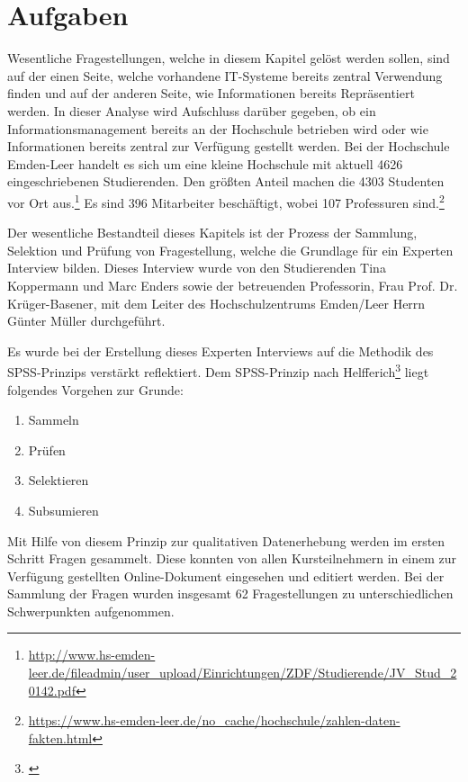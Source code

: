 \section{Aufgaben}
Wesentliche Fragestellungen, welche in diesem Kapitel gelöst werden sollen, sind auf der einen Seite, welche vorhandene IT-Systeme bereits zentral Verwendung finden und auf der anderen Seite, wie Informationen bereits Repräsentiert werden. In dieser Analyse wird Aufschluss darüber gegeben, ob ein Informationsmanagement bereits an der Hochschule betrieben wird oder wie Informationen bereits zentral zur Verfügung gestellt werden. 
Bei der Hochschule Emden-Leer handelt es sich um eine kleine Hochschule mit aktuell 4626 eingeschriebenen Studierenden. Den größten Anteil machen die 4303 Studenten vor Ort aus.\footnote{\url{http://www.hs-emden-leer.de/fileadmin/user_upload/Einrichtungen/ZDF/Studierende/JV_Stud_20142.pdf}} Es sind 396 Mitarbeiter beschäftigt, wobei 107 Professuren sind.\footnote{\url{https://www.hs-emden-leer.de/no_cache/hochschule/zahlen-daten-fakten.html}}

Der wesentliche Bestandteil dieses Kapitels ist der Prozess der Sammlung, Selektion und Prüfung von Fragestellung, welche die Grundlage für ein Experten Interview bilden. Dieses Interview wurde von den Studierenden Tina Koppermann und Marc Enders sowie der betreuenden Professorin, Frau Prof. Dr. Krüger-Basener, mit dem Leiter des Hochschulzentrums Emden/Leer Herrn Günter Müller durchgeführt. 

Es wurde bei der Erstellung dieses Experten Interviews auf die Methodik des SPSS-Prinzips verstärkt reflektiert. Dem SPSS-Prinzip nach Helfferich\footnote{\cite{helfferich_2009}} liegt folgendes Vorgehen zur Grunde:
\begin{enumerate}
	\item Sammeln
	\item Prüfen
	\item Selektieren
	\item Subsumieren		
\end{enumerate}
Mit Hilfe von diesem Prinzip zur qualitativen Datenerhebung werden im ersten Schritt Fragen gesammelt. Diese konnten von allen Kursteilnehmern in einem zur Verfügung gestellten Online-Dokument eingesehen und editiert werden. Bei der Sammlung der Fragen wurden insgesamt 62 Fragestellungen zu unterschiedlichen Schwerpunkten aufgenommen.

